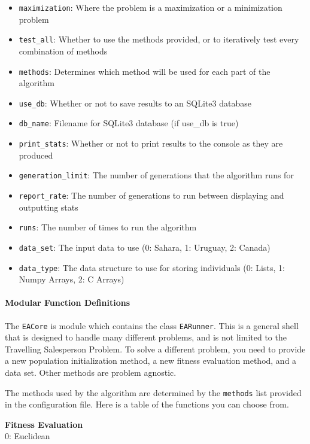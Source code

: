 \documentclass[11pt]{article}
\providecommand{\tightlist}{%
      \setlength{\itemsep}{0pt}\setlength{\parskip}{0pt}}
\begin{document}
    \begin{itemize}
\tightlist
\item
  \texttt{maximization}: Where the problem is a maximization or a
  minimization problem
\item
  \texttt{test\_all}: Whether to use the methods provided, or to
  iteratively test every combination of methods
\item
  \texttt{methods}: Determines which method will be used for each part
  of the algorithm
\item
  \texttt{use\_db}: Whether or not to save results to an SQLite3
  database
\item
  \texttt{db\_name}: Filename for SQLite3 database (if use\_db is true)
\item
  \texttt{print\_stats}: Whether or not to print results to the console
  as they are produced
\item
  \texttt{generation\_limit}: The number of generations that the
  algorithm runs for
\item
  \texttt{report\_rate}: The number of generations to run between
  displaying and outputting stats
\item
  \texttt{runs}: The number of times to run the algorithm
\item
  \texttt{data\_set}: The input data to use (0: Sahara, 1: Uruguay, 2:
  Canada)
\item
  \texttt{data\_type}: The data structure to use for storing individuals
  (0: Lists, 1: Numpy Arrays, 2: C Arrays)
\end{itemize}

    \paragraph{Modular Function
Definitions}\label{modular-function-definitions}

    The \texttt{EACore} is module which contains the class
\texttt{EARunner}. This is a general shell that is designed to handle
many different problems, and is not limited to the Travelling
Salesperson Problem. To solve a different problem, you need to provide a
new population initialization method, a new fitness evaluation method,
and a data set. Other methods are problem agnostic.

The methods used by the algorithm are determined by the \texttt{methods}
list provided in the configuration file. Here is a table of the
functions you can choose from.

\textbf{Fitness Evaluation}\\
0: Euclidean
\end{document}
